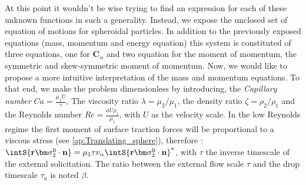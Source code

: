 At this point it wouldn't be wise trying to find an expression for each of these unknown functions in such a generality. 
Instead, we expose the unclosed set of equation of motions for spheroidal particles. 
In addition to the previously exposed equations (mass, momentum and energy equation) this system is constituted of three equations, one for $\textbf{C}_\alpha$ and two equation for the moment of momentum, the symmetric and skew-symmetric moment of momentum. 
Now, we would like to propose a more intuitive interpretation of the mass and momentum equations.
To that end, we make the problem dimensionless by introducing, 
the \textit{Capillary number} $Ca= \frac{\mu_1 U}{\gamma}$, The viscosity ratio $\lambda = \mu_2/\mu_1$, the density ratio $\zeta = \rho_2/\rho_1$ and the Reynolds number $Re = \frac{a U \rho_1}{\mu_1}$, with $U$ as the velocity scale. 
In the low Reynolds regime the first moment of surface traction forces will be proportional to a viscous stress (see \ref{ap:Translating_sphere}), therefore :$\intS{\textbf{r}\bm\sigma_2^0\cdot \textbf{n}} =\mu_1  \tau v_\alpha \intS{\textbf{r}\bm\sigma_2^0\cdot \textbf{n}}^*$, with $\tau$ the inverse timescale of the external solicitation.
The ratio between the external flow scale $\tau$ and the drop timescale $\tau_a$ is noted $\beta$. 

